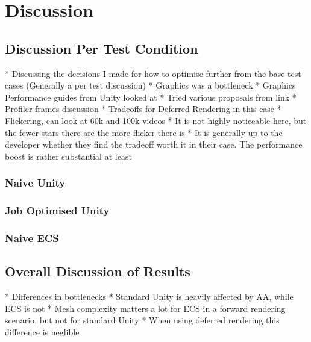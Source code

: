 \section{Discussion}
\subsection{Discussion Per Test Condition}
   * Discussing the decisions I made for how to optimise further from the base test cases (Generally a per test discussion)
      * Graphics was a bottleneck
            * Graphics Performance guides from Unity looked at
                  * Tried various proposals from link
   * Profiler frames discussion 
      * Tradeoffs for Deferred Rendering in this case
         * Flickering, can look at 60k and 100k videos
         * It is not highly noticeable here, but the fewer stars there are the more flicker there is
         * It is generally up to the developer whether they find the tradeoff worth it in their case. The performance boost is rather substantial at least
\subsubsection{Naive Unity}
\subsubsection{Job Optimised Unity}
\subsubsection{Naive ECS}

\subsection{Overall Discussion of Results}
* Differences in bottlenecks
         * Standard Unity is heavily affected by AA, while ECS is not
         * Mesh complexity matters a lot for ECS in a forward rendering scenario, but not for standard Unity
            * When using deferred rendering this difference is neglible

